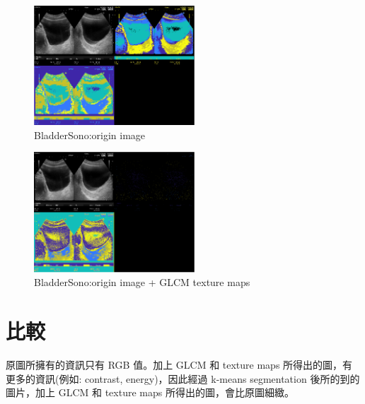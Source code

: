 \documentclass[conference]{IEEEtran}
\begin{document}
\begin{figure}[H]
\centerline{\includegraphics[width=6cm]{b1.png}}
\caption{BladderSono:origin image}
\label{BladderSono:origin image}
\end{figure}

\begin{figure}[H]
\centerline{\includegraphics[width=6cm]{b2.png}}
\caption{BladderSono:origin image + GLCM texture maps}
\label{BladderSono:origin image + GLCM texture maps}
\end{figure}

\section{比較}
原圖所擁有的資訊只有 RGB 值。加上 GLCM 和 texture maps 所得出的圖，有更多的資訊(例如: contrast, energy)，因此經過 k-means segmentation 後所的到的圖片，加上 GLCM 和 texture maps 所得出的圖，會比原圖細緻。


\vspace{12pt}
\end{document}
